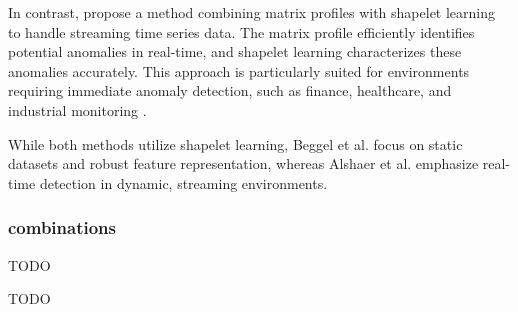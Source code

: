 In contrast,  propose a method combining matrix profiles with shapelet learning to handle streaming time series data. The matrix profile efficiently identifies potential anomalies in real-time, and shapelet learning characterizes these anomalies accurately. This approach is particularly suited for environments requiring immediate anomaly detection, such as finance, healthcare, and industrial monitoring \cite{alshaer_detecting_2020}.

While both methods utilize shapelet learning, Beggel et al. focus on static datasets and robust feature representation, whereas Alshaer et al. emphasize real-time detection in dynamic, streaming environments.
\subsubsection{combinations}

TODO \cite{aota_zero-shot_2023}  %

TODO \cite{li_zero-shot_2023}  %
